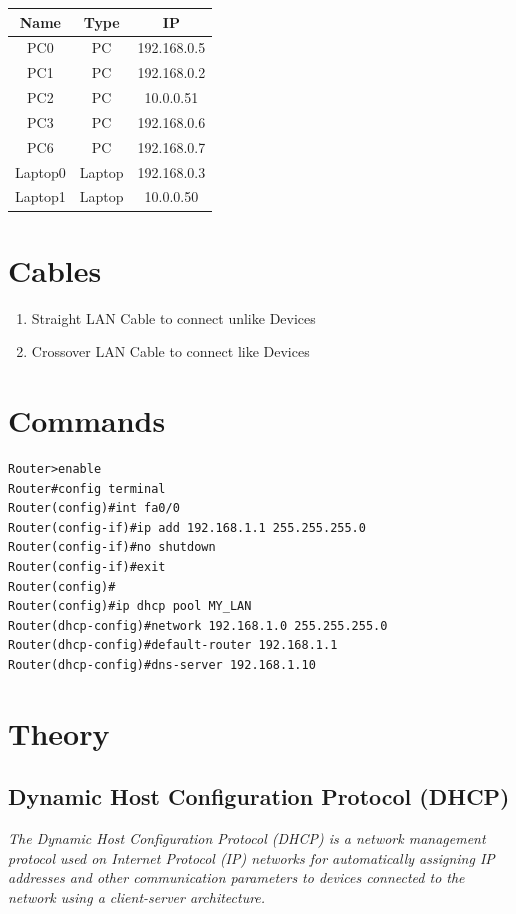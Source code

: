 \documentclass[11pt]{article}
\begin{document}
\begin{table}[H] 
	\centering
	\begin{tabular}{|c|c|c|}
	\hline
	\textbf{Name} & \textbf{Type}      & \textbf{IP}    \\ 
	\hline
	PC0           & PC                 & 192.168.0.5   \\ 
	\hline
	PC1           & PC                 & 192.168.0.2   \\ 
	\hline
	PC2           & PC                 & 10.0.0.51   \\ 
	\hline
	PC3           & PC                 & 192.168.0.6   \\ 
	\hline
	PC6           & PC                 & 192.168.0.7   \\ 
	\hline
	Laptop0       & Laptop             & 192.168.0.3   \\ 
	\hline
	Laptop1       & Laptop             & 10.0.0.50   \\ 
	\hline
	\end{tabular}
	\end{table}

\section{Cables}
\begin{enumerate}
	\item Straight LAN Cable to connect unlike Devices
	\item Crossover LAN Cable to connect like Devices
\end{enumerate}

\section{Commands}
\begin{verbatim}
Router>enable
Router#config terminal
Router(config)#int fa0/0
Router(config-if)#ip add 192.168.1.1 255.255.255.0
Router(config-if)#no shutdown
Router(config-if)#exit
Router(config)#
Router(config)#ip dhcp pool MY_LAN
Router(dhcp-config)#network 192.168.1.0 255.255.255.0
Router(dhcp-config)#default-router 192.168.1.1
Router(dhcp-config)#dns-server 192.168.1.10
\end{verbatim}

\section{Theory}
\subsection{Dynamic Host Configuration Protocol (DHCP)}
\textit{The Dynamic Host Configuration Protocol (DHCP) is a network management protocol used on Internet Protocol (IP) networks for automatically assigning IP addresses and other communication parameters to devices connected to the network using a client-server architecture.}\\
\end{document}
